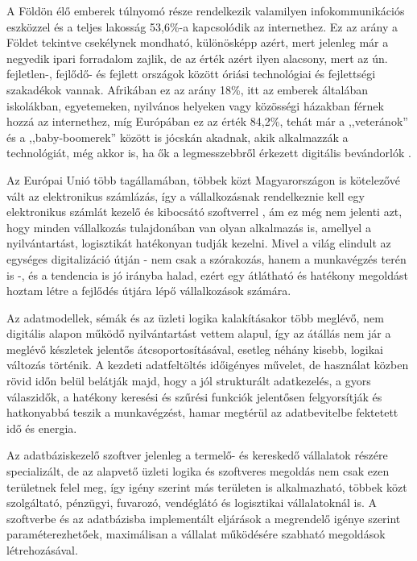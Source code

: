 


\hspace{12.5mm}A Földön élő emberek túlnyomó része rendelkezik valamilyen infokommunikációs eszközzel és a teljes lakosság 53,6\%-a kapcsolódik az internethez. Ez az arány a Földet tekintve csekélynek mondható, különösképp azért, mert jelenleg már a negyedik ipari forradalom zajlik, de az érték azért ilyen alacsony, mert az ún. fejletlen-, fejlődő- és fejlett országok között óriási technológiai és fejlettségi szakadékok vannak. Afrikában ez az arány 18\%, itt az emberek általában iskolákban, egyetemeken, nyilvános helyeken vagy közösségi házakban férnek hozzá az internethez, míg Európában ez az érték 84,2\%, tehát már a ,,veteránok'' és a ,,baby-boomerek'' között is jócskán akadnak, akik alkalmazzák a technológiát, még akkor is, ha ők a legmesszebbről érkezett digitális bevándorlók \cite{itu_ict_fac_fig_2017}.\par

\setlength{\parindent}{12.5mm}Az Európai Unió több tagállamában, többek közt Magyarországon is kötelezővé vált az elektronikus számlázás, így a vállalkozásnak rendelkeznie kell egy  elektronikus számlát kezelő és kibocsátó szoftverrel \cite{nav_online_szla}, ám ez még nem jelenti azt, hogy minden vállalkozás tulajdonában van olyan alkalmazás is, amellyel a nyilvántartást, logisztikát hatékonyan tudják kezelni. Mivel a világ elindult az egységes digitalizáció útján - nem csak a szórakozás, hanem a munkavégzés terén is -, és a tendencia is jó irányba halad, ezért egy átlátható és hatékony megoldást hoztam létre a fejlődés útjára lépő vállalkozások számára.\par

\setlength{\parindent}{12.5mm}Az adatmodellek, sémák és az üzleti logika kalakításakor több meglévő, nem digitális alapon működő nyilvántartást vettem alapul, így az átállás nem jár a meglévő készletek jelentős átcsoportosításával, esetleg néhány kisebb, logikai változás történik. A kezdeti adatfeltöltés időigényes művelet, de használat közben rövid időn belül belátják majd, hogy a jól strukturált adatkezelés, a gyors válaszidők, a hatékony keresési és szűrési funkciók jelentősen felgyorsítják és hatkonyabbá teszik a munkavégzést, hamar megtérül az adatbevitelbe fektetett idő és energia.\par

\setlength{\parindent}{12.5mm}Az adatbáziskezelő szoftver jelenleg a termelő- és kereskedő vállalatok részére specializált, de az alapvető üzleti logika és szoftveres megoldás nem csak ezen területnek felel meg, így igény szerint más területen is alkalmazható, többek közt szolgáltató, pénzügyi, fuvarozó, vendéglátó és logisztikai vállalatoknál is. A szoftverbe és az adatbázisba implementált eljárások a megrendelő igénye szerint paraméterezhetőek, maximálisan a vállalat működésére szabható megoldások létrehozásával.\par


